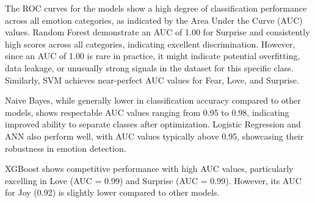 The ROC curves for the models show a high degree of classification performance across all emotion categories, as indicated by the Area Under the Curve (AUC) values. Random Forest demonstrate an AUC of 1.00 for Surprise and consistently high scores across all categories, indicating excellent discrimination. However, since an AUC of 1.00 is rare in practice, it might indicate potential overfitting, data leakage, or unusually strong signals in the dataset for this specific class. Similarly, SVM achieves near-perfect AUC values for Fear, Love, and Surprise.

Naive Bayes, while generally lower in classification accuracy compared to other models, shows respectable AUC values ranging from 0.95 to 0.98, indicating improved ability to separate classes after optimization. Logistic Regression and ANN also perform well, with AUC values typically above 0.95, showcasing their robustness in emotion detection.

XGBoost shows competitive performance with high AUC values, particularly excelling in Love (AUC = 0.99) and Surprise (AUC = 0.99). However, its AUC for Joy (0.92) is slightly lower compared to other models.


\clearpage